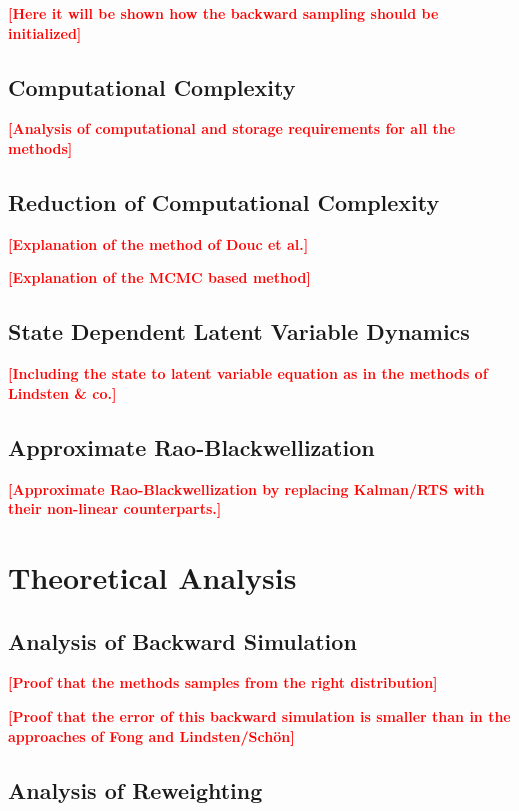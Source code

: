 \documentclass[twocolumn]{autart}    %
\newcommand{\comment}[1]{\textcolor{red}{\textbf{[#1]}}}
\begin{document}
\comment{Here it will be shown how the backward sampling should
 be initialized}


\subsection{Computational Complexity}

\comment{Analysis of computational and storage requirements for all
  the methods}


\subsection{Reduction of Computational Complexity}

\comment{Explanation of the method of Douc et al.}

\comment{Explanation of the MCMC based method}


\subsection{State Dependent Latent Variable Dynamics}

\comment{Including the state to latent variable equation as in the
  methods of Lindsten \& co.}

\subsection{Approximate Rao-Blackwellization}

\comment{Approximate Rao-Blackwellization by replacing Kalman/RTS
with their non-linear counterparts.}




\section{Theoretical Analysis}

\subsection{Analysis of Backward Simulation}

\comment{Proof that the methods samples from the right distribution}

\comment{Proof that the error of this backward simulation
is smaller than in the approaches of Fong and Lindsten/Sch\"on}

\subsection{Analysis of Reweighting}
\end{document}
